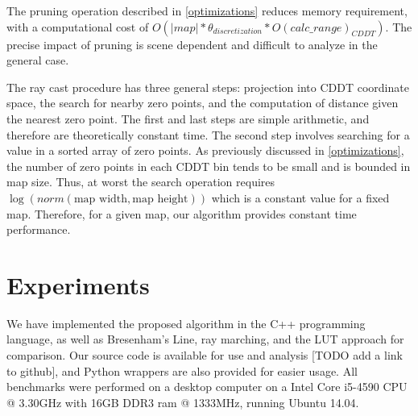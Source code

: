 \documentclass[letterpaper, 10 pt, conference]{ieeeconf}  %
\begin{document}
The pruning operation described in \ref{optimizations} reduces memory requirement, with a computational cost of $O(|map|*\theta_{discretization}*O(calc\_range)_{CDDT})$. The precise impact of pruning is scene dependent and difficult to analyze in the general case.

The ray cast procedure has three general steps: projection into CDDT coordinate space, the search for nearby zero points, and the computation of distance given the nearest zero point. The first and last steps are simple arithmetic, and therefore are theoretically constant time. The second step involves searching for a value in a sorted array of zero points. As previously discussed in \ref{optimizations}, the number of zero points in each CDDT bin tends to be small and is bounded in map size. Thus, at worst the search operation requires $\log{(norm(\text{map width},\text{map height}))}$ which is a constant value for a fixed map. Therefore, for a given map, our algorithm provides constant time performance.

\section{Experiments}

We have implemented the proposed algorithm in the C++ programming language, as well as Bresenham’s Line, ray marching, and the LUT approach for comparison. Our source code is available for use and analysis [TODO add a link to github], and Python wrappers are also provided for easier usage. All benchmarks were performed on a desktop computer on a Intel Core i5-4590 CPU @ 3.30GHz with 16GB DDR3 ram @ 1333MHz, running Ubuntu 14.04.
\end{document}
